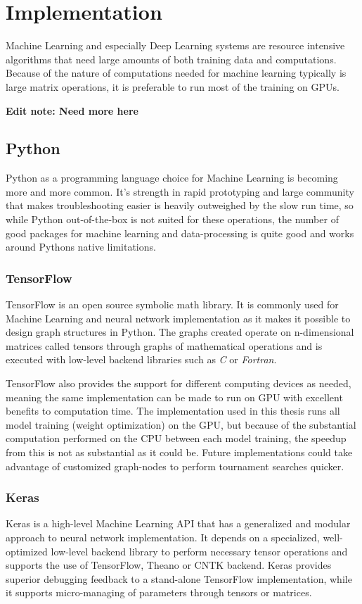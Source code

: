 \chapter{Implementation}
\label{implementation}
Machine Learning and especially Deep Learning systems are resource intensive algorithms that need large amounts of both training data and computations. Because of the nature of computations needed for machine learning typically is large matrix operations, it is preferable to run most of the training on GPUs.

\textbf{Edit note: Need more here}

\section{Python}
Python as a programming language choice for Machine Learning is becoming more and more common. It's strength in rapid prototyping and large community that makes troubleshooting easier is heavily outweighed by the slow run time, so while Python out-of-the-box is not suited for these operations, the number of good packages for machine learning and data-processing is quite good and works around Pythons native limitations. 

\subsection{TensorFlow}
TensorFlow\cite{tensorflow} is an open source symbolic math library. It is commonly used for Machine Learning and neural network implementation as it makes it possible to design graph structures in Python. The graphs created operate on n-dimensional matrices called tensors through graphs of mathematical operations and is executed with low-level backend libraries such as \textit{C} or \textit{Fortran}.

TensorFlow also provides the support for different computing devices as needed, meaning the same implementation can be made to run on GPU with excellent benefits to computation time. The implementation used in this thesis runs all model training (weight optimization) on the GPU, but because of the substantial computation performed on the CPU between each model training, the speedup from this is not as substantial as it could be. Future implementations could take advantage of customized graph-nodes to perform tournament searches quicker. 

\subsection{Keras}
Keras\cite{keras} is a high-level Machine Learning API that has a generalized and modular approach to neural network implementation. It depends on a specialized, well-optimized low-level backend library to perform necessary tensor operations and supports the use of TensorFlow, Theano or CNTK backend. Keras provides superior debugging feedback to a stand-alone TensorFlow implementation, while it supports micro-managing of parameters through tensors or matrices.

